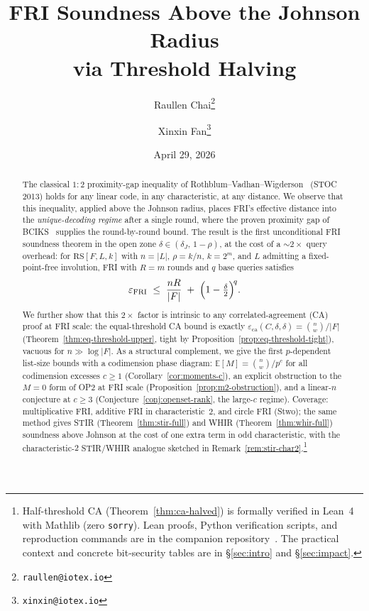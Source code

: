 \documentclass[11pt]{article}
\title{FRI Soundness Above the Johnson Radius\\via Threshold Halving}
\author[1]{Raullen Chai\thanks{\texttt{raullen@iotex.io}}}
\author[1]{Xinxin Fan\thanks{\texttt{xinxin@iotex.io}}}
\affil[1]{IoTeX Network}
\date{April 29, 2026}
\newcommand{\RS}{\mathrm{RS}}
\newcommand{\EE}{\mathbb{E}}
\begin{document}
\maketitle

\begin{abstract}
The classical $1{:}2$ proximity-gap inequality of Rothblum--Vadhan--Wigderson~\cite{RVW} (STOC 2013) holds for any linear code, in any characteristic, at any distance.  We observe that this inequality, applied above the Johnson radius, places FRI's effective distance into the \emph{unique-decoding regime} after a single round, where the proven proximity gap of BCIKS~\cite{BCIKS} supplies the round-by-round bound.  The result is the first unconditional FRI soundness theorem in the open zone $\delta \in (\delta_J,\, 1{-}\rho)$, at the cost of a ${\sim}2{\times}$ query overhead: for $\RS[F, L, k]$ with $n = |L|$, $\rho = k/n$, $k = 2^m$, and $L$ admitting a fixed-point-free involution, FRI with $R = m$ rounds and $q$ base queries satisfies
$$\varepsilon_{\mathrm{FRI}} \;\leq\; \frac{nR}{|F|} \;+\; \Bigl(1 - \tfrac{\delta}{2}\Bigr)^{\!q}.$$
We further show that this $2{\times}$ factor is intrinsic to any correlated-agreement (CA) proof at FRI scale: the equal-threshold CA bound is exactly $\varepsilon_{\mathrm{ca}}(C, \delta, \delta) = \binom{n}{w}/|F|$ (Theorem~\ref{thm:eq-threshold-upper}, tight by Proposition~\ref{prop:eq-threshold-tight}), vacuous for $n \gg \log|F|$.  As a structural complement, we give the first $p$-dependent list-size bounds with a codimension phase diagram: $\EE[M] = \binom{n}{w}/p^c$ for all codimension excesses $c \geq 1$ (Corollary~\ref{cor:moments-c}), an explicit obstruction to the $M = 0$ form of OP2 at FRI scale (Proposition~\ref{prop:m2-obstruction}), and a linear-$n$ conjecture at $c \geq 3$ (Conjecture~\ref{conj:openset-rank}, the large-$c$ regime).  Coverage: multiplicative FRI, additive FRI in characteristic~$2$, and circle FRI (Stwo); the same method gives STIR (Theorem~\ref{thm:stir-full}) and WHIR (Theorem~\ref{thm:whir-full}) soundness above Johnson at the cost of one extra term in odd characteristic, with the characteristic-$2$ STIR/WHIR analogue sketched in Remark~\ref{rem:stir-char2}.\footnote{Half-threshold CA (Theorem~\ref{thm:ca-halved}) is formally verified in Lean~4 with Mathlib (zero \texttt{sorry}). Lean proofs, Python verification scripts, and reproduction commands are in the companion repository~\cite{CompanionRepo}.  The practical context and concrete bit-security tables are in \S\ref{sec:intro} and \S\ref{sec:impact}.}
\end{abstract}
\end{document}
